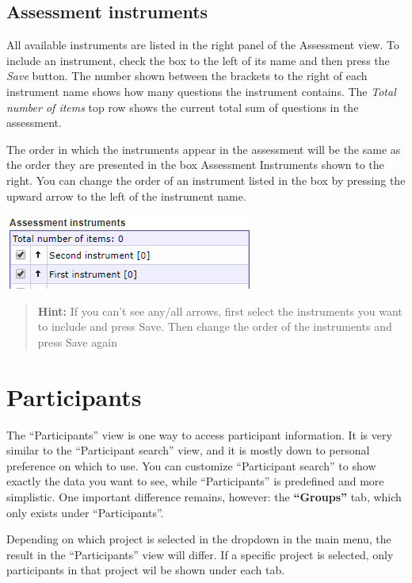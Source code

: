 \documentclass[]{book}
\begin{document}
\hypertarget{assessment-instruments}{%
\section{Assessment instruments}\label{assessment-instruments}}

All available instruments are listed in the right panel of the Assessment view. To include an instrument, check the box to the left of its name and then press the \emph{Save} button. The number shown between the brackets to the right of each instrument name shows how many questions the instrument contains. The \emph{Total number of items} top row shows the current total sum of questions in the assessment.

The order in which the instruments appear in the assessment will be the same as the order they are presented in the box Assessment Instruments shown to the right. You can change the order of an instrument listed in the box by pressing the upward arrow to the left of the instrument name.

\includegraphics{images/assessment-instrument.png}

\begin{quote}
\textbf{Hint:} If you can't see any/all arrows, first select the instruments you want to include and press Save. Then change the order of the instruments and press Save again
\end{quote}

\hypertarget{participants}{%
\chapter{Participants}\label{participants}}

The ``Participants'' view is one way to access participant information. It is very similar to the ``Participant search'' view, and it is mostly down to personal preference on which to use. You can customize ``Participant search'' to show exactly the data you want to see, while ``Participants'' is predefined and more simplistic. One important difference remains, however: the \textbf{``Groups''} tab, which only exists under ``Participants''.

Depending on which project is selected in the dropdown in the main menu, the result in the ``Participants'' view will differ. If a specific project is selected, only participants in that project wil be shown under each tab.
\end{document}
